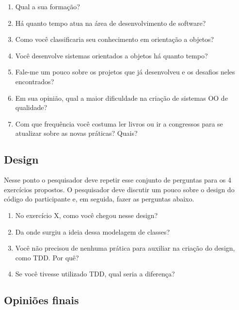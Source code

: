 \begin{enumerate}
	\item Qual a sua formação?

	\item Há quanto tempo atua na área de desenvolvimento de software?

	\item Como você classificaria seu conhecimento em orientação a objetos?

	\item Você desenvolve sistemas orientados a objetos há quanto tempo?	

	\item Fale-me um pouco sobre os projetos que já desenvolveu e os desafios 
	neles encontrados?

	\item Em sua opinião, qual a maior dificuldade na criação de sistemas OO de
	qualidade?

	\item Com que frequência você costuma ler livros ou ir a congressos para se 
	atualizar sobre as novas práticas? Quais?

\end{enumerate}

\subsection{Design}

Nesse ponto o pesquisador deve repetir esse conjunto de perguntas
para os 4 exercícios propostos.
O pesquisador deve discutir um pouco sobre o design do código do participante e, em seguida,
fazer as perguntas abaixo.

\begin{enumerate}
	
	\item No exercício X, como você chegou nesse design?
	
	\item Da onde surgiu a ideia dessa modelagem de classes?
	
	\item Você não precisou de nenhuma prática para auxiliar na criação do design, como TDD. Por quê?
	
	\item Se você tivesse utilizado TDD, qual seria a diferença?
	
\end{enumerate}

\subsection{Opiniões finais}

